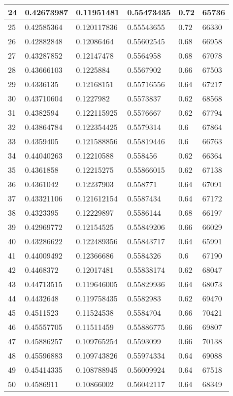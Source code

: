 \begin{longtable}{|l|l|l|l|l|l|}
24 & 0.42673987 & 0.11951481 & 0.55473435 & 0.72 & 65736 \\ \hline 
25 & 0.42585364 & 0.120117836 & 0.55543655 & 0.72 & 66330 \\ \hline 
26 & 0.42882848 & 0.12086464 & 0.55602545 & 0.68 & 66958 \\ \hline 
27 & 0.43287852 & 0.12147478 & 0.5564958 & 0.68 & 67078 \\ \hline 
28 & 0.43666103 & 0.1225884 & 0.5567902 & 0.66 & 67503 \\ \hline 
29 & 0.4336135 & 0.12168151 & 0.55716556 & 0.64 & 67217 \\ \hline 
30 & 0.43710604 & 0.1227982 & 0.5573837 & 0.62 & 68568 \\ \hline 
31 & 0.4382594 & 0.122115925 & 0.5576667 & 0.62 & 67794 \\ \hline 
32 & 0.43864784 & 0.122354425 & 0.5579314 & 0.6 & 67864 \\ \hline 
33 & 0.4359405 & 0.121588856 & 0.55819446 & 0.6 & 66763 \\ \hline 
34 & 0.44040263 & 0.12210588 & 0.558456 & 0.62 & 66364 \\ \hline 
35 & 0.4361858 & 0.12215275 & 0.55866015 & 0.62 & 67138 \\ \hline 
36 & 0.4361042 & 0.12237903 & 0.558771 & 0.64 & 67091 \\ \hline 
37 & 0.43321106 & 0.121612154 & 0.5587434 & 0.64 & 67172 \\ \hline 
38 & 0.4323395 & 0.12229897 & 0.5586144 & 0.68 & 66197 \\ \hline 
39 & 0.42969772 & 0.12154525 & 0.55849206 & 0.66 & 66029 \\ \hline 
40 & 0.43286622 & 0.122489356 & 0.55843717 & 0.64 & 65991 \\ \hline 
41 & 0.44009492 & 0.12366686 & 0.5584326 & 0.6 & 67190 \\ \hline 
42 & 0.4468372 & 0.12017481 & 0.55838174 & 0.62 & 68047 \\ \hline 
43 & 0.44713515 & 0.119646005 & 0.55829936 & 0.64 & 68073 \\ \hline 
44 & 0.4432648 & 0.119758435 & 0.5582983 & 0.62 & 69470 \\ \hline 
45 & 0.4511523 & 0.11524538 & 0.5584704 & 0.66 & 70421 \\ \hline 
46 & 0.45557705 & 0.11511459 & 0.55886775 & 0.66 & 69807 \\ \hline 
47 & 0.45886257 & 0.109765254 & 0.5593099 & 0.66 & 70138 \\ \hline 
48 & 0.45596883 & 0.109743826 & 0.55974334 & 0.64 & 69088 \\ \hline 
49 & 0.45414335 & 0.108788945 & 0.56009924 & 0.64 & 67518 \\ \hline 
50 & 0.4586911 & 0.10866002 & 0.56042117 & 0.64 & 68349 \\ \hline 
\end{longtable}